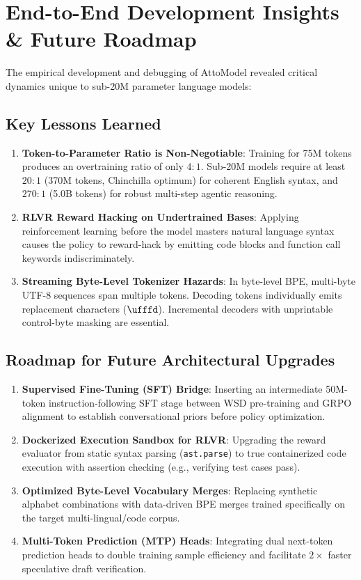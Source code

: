 \documentclass[10pt,twocolumn,letterpaper]{article}
\begin{document}
\section{End-to-End Development Insights \& Future Roadmap}

The empirical development and debugging of AttoModel revealed critical dynamics unique to sub-20M parameter language models:

\subsection{Key Lessons Learned}
\begin{enumerate}
    \item \textbf{Token-to-Parameter Ratio is Non-Negotiable}: Training for 75M tokens produces an overtraining ratio of only $4:1$. Sub-20M models require at least $20:1$ (370M tokens, Chinchilla optimum) for coherent English syntax, and $270:1$ (5.0B tokens) for robust multi-step agentic reasoning.
    \item \textbf{RLVR Reward Hacking on Undertrained Bases}: Applying reinforcement learning before the model masters natural language syntax causes the policy to reward-hack by emitting code blocks and function call keywords indiscriminately.
    \item \textbf{Streaming Byte-Level Tokenizer Hazards}: In byte-level BPE, multi-byte UTF-8 sequences span multiple tokens. Decoding tokens individually emits replacement characters ($\text{\ufffd}$). Incremental decoders with unprintable control-byte masking are essential.
\end{enumerate}

\subsection{Roadmap for Future Architectural Upgrades}
\begin{enumerate}
    \item \textbf{Supervised Fine-Tuning (SFT) Bridge}: Inserting an intermediate 50M-token instruction-following SFT stage between WSD pre-training and GRPO alignment to establish conversational priors before policy optimization.
    \item \textbf{Dockerized Execution Sandbox for RLVR}: Upgrading the reward evaluator from static syntax parsing (\texttt{ast.parse}) to true containerized code execution with assertion checking (e.g., verifying test cases pass).
    \item \textbf{Optimized Byte-Level Vocabulary Merges}: Replacing synthetic alphabet combinations with data-driven BPE merges trained specifically on the target multi-lingual/code corpus.
    \item \textbf{Multi-Token Prediction (MTP) Heads}: Integrating dual next-token prediction heads to double training sample efficiency and facilitate $2\times$ faster speculative draft verification.
\end{enumerate}
\end{document}
